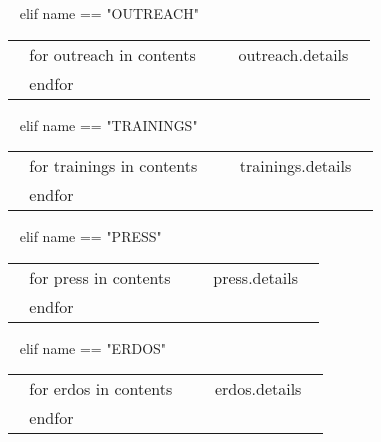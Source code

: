 \begin{minipage}{\textwidth}

~{ elif name == "OUTREACH" }~

\begin{tabular}{ @{} p{32mm} p{135mm} @{} }
  ~{ for outreach in contents }~
  \small \textcolor{gray}{{\emph{ }}} & {\small ~{{ outreach.details }}~} \\
  ~{ endfor }~
\end{tabular}


~{ elif name == "TRAININGS" }~

\begin{tabular}{ @{} p{32mm} p{135mm} @{} }
  ~{ for trainings in contents }~
  \small \textcolor{gray}{{\emph{ }}} & {\small ~{{ trainings.details }}~} \\
  ~{ endfor }~
\end{tabular}

~{ elif name == "PRESS" }~

\begin{tabular}{ @{} p{32mm} p{135mm} @{} }
  ~{ for press in contents }~
  \small \textcolor{gray}{{\emph{ }}} & {\small ~{{ press.details }}~} \\
  ~{ endfor }~
\end{tabular}


~{ elif name == "ERDOS" }~

\begin{tabular}{ @{} p{32mm} p{135mm} @{} }
  ~{ for erdos in contents }~
  \small \textcolor{gray}{{\emph{ }}} & {\small ~{{ erdos.details }}~} \\
  ~{ endfor }~
\end{tabular}



\end{minipage}
